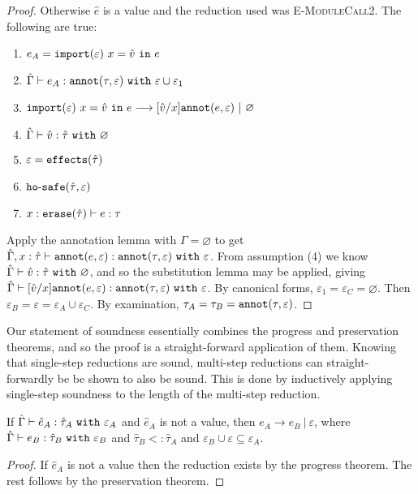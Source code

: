 \begin{proof}
Otherwise $\hat e$ is a value and the reduction used was \textsc{E-ModuleCall2}. The following are true:
\begin{enumerate}
	\setlength\itemsep{-0.7em}
	\item $e_A = \mathtt{import}(\varepsilon)~x = \hat v~\mathtt{in}~ e$
	\item $\hat \Gamma \vdash e_A: \mathtt{annot}(\tau, \varepsilon)~\mathtt{with}~ \varepsilon \cup \varepsilon_1$
	\item $\mathtt{import}(\varepsilon)~x = \hat v~\mathtt{in}~ e \longrightarrow [\hat v/x]\mathtt{annot}(e, \varepsilon)~|~\varnothing$
	\item $\hat \Gamma \vdash \hat v: \hat \tau~\mathtt{with}~ \varnothing$
	\item $\varepsilon = \mathtt{effects}(\hat \tau)$
	\item $\mathtt{ho \hbox{-} safe}(\hat \tau, \varepsilon)$
	\item $x: \mathtt{erase}(\hat \tau) \vdash e: \tau$
\end{enumerate}

\noindent
Apply the annotation lemma with $\Gamma = \varnothing$ to get $\hat \Gamma, x: \hat \tau \vdash \mathtt{annot}(e, \varepsilon): \mathtt{annot}(\tau, \varepsilon)~\mathtt{with}~ \varepsilon$. From assumption (4) we know $\hat \Gamma \vdash \hat v: \hat \tau~\mathtt{with}~ \varnothing$, and so the substitution lemma may be applied, giving $\hat \Gamma \vdash [\hat v/x]\mathtt{annot}(e, \varepsilon): \mathtt{annot}(\tau, \varepsilon)~\mathtt{with}~ \varepsilon$. By canonical forms, $\varepsilon_1 = \varepsilon_C = \varnothing$. Then $\varepsilon_B = \varepsilon = \varepsilon_A \cup \varepsilon_C$. By examination, $\tau_A = \tau_B = \mathtt{annot}(\tau, \varepsilon)$.
\end{proof}

\noindent
Our statement of soundness essentially combines the progress and preservation theorems, and so the proof is a straight-forward application of them. Knowing that single-step reductions are sound, multi-step reductions can straight-forwardly be be shown to also be sound. This is done by inductively applying single-step soundness to the length of the multi-step reduction.

\begin{theorem}[Soundness]
If $\hat \Gamma \vdash \hat e_A: \hat \tau_A~\mathtt{with}~ \varepsilon_A$ and $\hat e_A$ is not a value, then $e_A \longrightarrow e_B~|~\varepsilon$, where $\hat \Gamma \vdash e_B: \hat \tau_B~\mathtt{with}~ \varepsilon_B$ and $\hat \tau_B <: \hat \tau_A$ and $\varepsilon_B \cup \varepsilon \subseteq \varepsilon_A$.
\end{theorem}
\begin{proof}
If $\hat e_A$ is not a value then the reduction exists by the progress theorem. The rest follows by the preservation theorem.
\end{proof}

